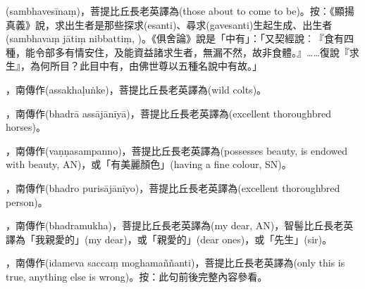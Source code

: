 \startitemgroup[noteitems]
\item{}(sambhavesīnaṃ)，菩提比丘長老英譯為(those about to come to be)。按：《顯揚真義》說，求出生者是那些探求(esanti)、尋求(gavesanti)生起生成、出生者(sambhavaṃ jātiṃ nibbattiṃ, )。《俱舍論》說是「中有」：「又契經說︰『食有四種，能令部多有情安住，及能資益諸求生者，無漏不然，故非食體。』……復說『求生』，為何所目？此目中有，由佛世尊以五種名說中有故。」
\stopitemgroup

\startitemgroup[noteitems]
\item{}，南傳作(assakhaḷuṅke)，菩提比丘長老英譯為(wild colts)。
\item{}，南傳作(bhadrā assājānīyā)，菩提比丘長老英譯為(excellent thoroughbred horses)。
\stopitemgroup

\startitemgroup[noteitems]
\item{}，南傳作(vaṇṇasampanno)，菩提比丘長老英譯為(possesses beauty, is endowed with beauty, AN)，或「有美麗顏色」(having a fine colour, SN)。
\stopitemgroup

\startitemgroup[noteitems]
\item{}，南傳作(bhadro purisājānīyo)，菩提比丘長老英譯為(excellent thoroughbred person)。
\item{}，南傳作(bhadramukha)，菩提比丘長老英譯為(my dear, AN)，智髻比丘長老英譯為「我親愛的」(my dear)，或「親愛的」(dear ones)，或「先生」(sir)。
\stopitemgroup

\startitemgroup[noteitems]
\item{}，南傳作(idameva saccaṃ moghamaññanti)，菩提比丘長老英譯為(only this is true, anything else is wrong)。按：此句前後完整內容參看。
\stopitemgroup

